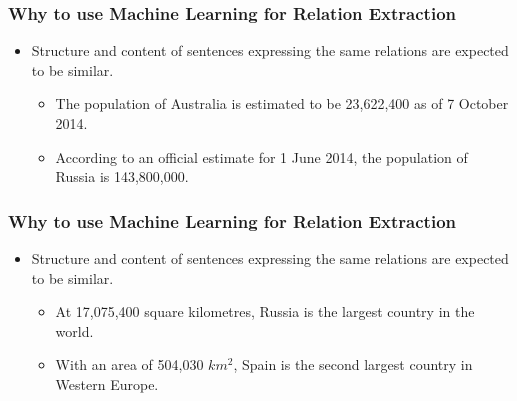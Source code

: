 \documentclass{beamer}
\begin{document}
\begin{frame}
 
 \frametitle{Why to use Machine Learning for Relation Extraction}
 
 \begin{itemize}
  
  \item  Structure and content of sentences expressing the same relations are expected to be similar. \pause
    
    \begin{itemize}
      \item The population of Australia is estimated to be 23,622,400 as of 7 October 2014.
      \item According to an official estimate for 1 June 2014, the population of Russia is 143,800,000. 
      
      
    \end{itemize}
      
    
 \end{itemize}
\end{frame}

\begin{frame}
 
 \frametitle{Why to use Machine Learning for Relation Extraction}
 
 \begin{itemize}
  
  \item  Structure and content of sentences expressing the same relations are expected to be similar. 
    
    \begin{itemize}   
	
      \item At 17,075,400 square kilometres, Russia is the largest country in the world.
      \item With an area of 504,030 $km^{2}$, Spain is the second largest country in Western Europe.
      
    \end{itemize}
 \end{itemize}
\end{frame}
\end{document}

